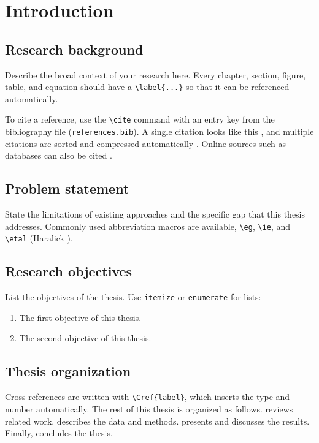 \chapter{Introduction} \label{chapter1}

\section{Research background} \label{chap1:sec1}

Describe the broad context of your research here. Every chapter, section, figure, table, and equation should have a \verb|\label{...}| so that it can be referenced automatically.

To cite a reference, use the \verb|\cite| command with an entry key from the bibliography file (\texttt{references.bib}). A single citation looks like this \cite{RN35}, and multiple citations are sorted and compressed automatically \cite{haralick1973a, akiba2019optuna, zhou_unet_2018}. Online sources such as databases can also be cited \cite{nier_weis}.

\section{Problem statement} \label{chap1:sec2}

State the limitations of existing approaches and the specific gap that this thesis addresses. Commonly used abbreviation macros are available, \eg \verb|\eg|, \verb|\ie|, and \verb|\etal| (\eg Haralick \etal \cite{haralick1973a}).

\section{Research objectives} \label{chap1:sec3}

List the objectives of the thesis. Use \texttt{itemize} or \texttt{enumerate} for lists:
\begin{enumerate}[label=(\arabic*)]
    \item The first objective of this thesis.
    \item The second objective of this thesis.
\end{enumerate}

\section{Thesis organization} \label{chap1:sec4}

Cross-references are written with \verb|\Cref{label}|, which inserts the type and number automatically. The rest of this thesis is organized as follows.  reviews related work.  describes the data and methods.  presents and discusses the results. Finally,  concludes the thesis.
